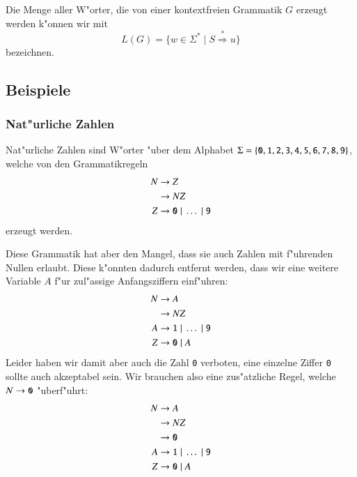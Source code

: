 \begin{definition}
Die Menge aller W"orter, die von einer kontextfreien Grammatik 
$G$ erzeugt werden k"onnen wir mit
\[
L(G)=\{w\in\Sigma^*\;|\; S\overset{*}{\Rightarrow} u\}
\]
bezeichnen.
\end{definition}

\subsection{Beispiele}
\subsubsection{Nat"urliche Zahlen}
Nat"urliche Zahlen sind W"orter "uber dem Alphabet $\Sigma=\{
{\tt 0},
{\tt 1},
{\tt 2},
{\tt 3},
{\tt 4},
{\tt 5},
{\tt 6},
{\tt 7},
{\tt 8},
{\tt 9}\}$, welche von den Grammatikregeln
\begin{align*}
N&\to Z\\
 &\to NZ\\
Z&\to {\tt 0}\;|\;\dots \;|\;{\tt 9}
\end{align*}
erzeugt werden.

Diese Grammatik hat aber den Mangel, dass sie auch Zahlen
mit f"uhrenden Nullen erlaubt. Diese k"onnten dadurch entfernt
werden, dass wir eine weitere Variable $A$ f"ur zul"assige
Anfangsziffern einf"uhren:
\begin{align*}
N&\to A\\
 &\to NZ\\
A&\to {\tt 1}\;|\;\dots\;|\;{\tt 9}\\
Z&\to {\tt 0}\;|\; A
\end{align*}
Leider haben wir damit aber auch die Zahl {\tt 0} verboten,
eine einzelne Ziffer {\tt 0} sollte auch akzeptabel sein.
Wir brauchen also eine zus"atzliche Regel, welche $N\to{\tt 0}$
"uberf"uhrt:
\begin{align*}
N&\to A\\
 &\to NZ\\
 &\to {\tt 0}\\
A&\to {\tt 1}\;|\;\dots\;|\;{\tt 9}\\
Z&\to {\tt 0}\;|\; A
\end{align*}
